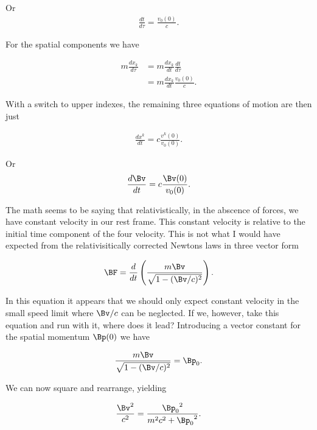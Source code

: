 Or 
\begin{align}\label{eqn:constFourMomentum:qqq8}
\frac{dt}{d\tau} = \frac{v_0(0)}{c}.
\end{align}

For the spatial components we have

\begin{align*}
m \frac{d x_k}{d\tau} 
&=
m \frac{d x_k}{dt}  \frac{dt}{d\tau} \\
&=
m \frac{d x_k}{dt}  \frac{v_0(0)}{c}.
\end{align*}

With a switch to upper indexes, the remaining three equations of motion are then just

\begin{align}\label{eqn:constFourMomentum:qqq10}
\frac{d x^k}{dt} = c \frac{ v^k(0) }{ v_0(0) }.
\end{align}

Or
\begin{align}\label{eqn:constFourMomentum:qqq10a}
\frac{d \Bv}{dt} = c \frac{ \Bv(0) }{ v_0(0) }.
\end{align}

The math seems to be saying that relativistically, in the abscence of forces, we have constant velocity in our rest frame.  This constant velocity is relative to the initial time component of the four velocity.  This is not what I would have expected from the relativisitically corrected Newtons laws in three vector form

\begin{align}\label{eqn:constFourMomentum:qqq11}
\BF = \frac{d}{dt}\left( \frac{m \Bv}{\sqrt{1 - (\Bv/c)^2}} \right).
\end{align}

In this equation it appears that we should only expect constant velocity in the small speed limit where $\Bv/c$ can be neglected.  If we, however, take this equation and run with it, where does it lead?  Introducing a vector constant for the spatial momentum $\Bp(0)$ we have

\begin{align}\label{eqn:constFourMomentum:qqq12}
\frac{m \Bv}{\sqrt{1 - (\Bv/c)^2}} = \Bp_0.
\end{align}

We can now square and rearrange, yielding

\begin{align}\label{eqn:constFourMomentum:qqq13}
\frac{\Bv^2}{c^2} = \frac{ {\Bp_0}^2 } { m^2 c^2 + {\Bp_0}^2 }.
\end{align}


